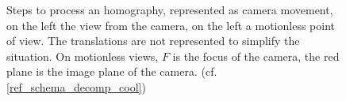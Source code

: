 \begin{figure}
		\caption{Steps to process an homography, represented as camera movement, on the left the view from the camera, on the left a motionless point of view. The translations are not represented to simplify the situation. On motionless views, $F$ is the focus of the camera, the red plane is the image plane of the camera. (cf. \ref{ref_schema_decomp_cool})}
		\label{schema_decomp_cool}
		\label{SchemaEtapesDecompoGeometrique}
	\end{figure}
	\clearpage
